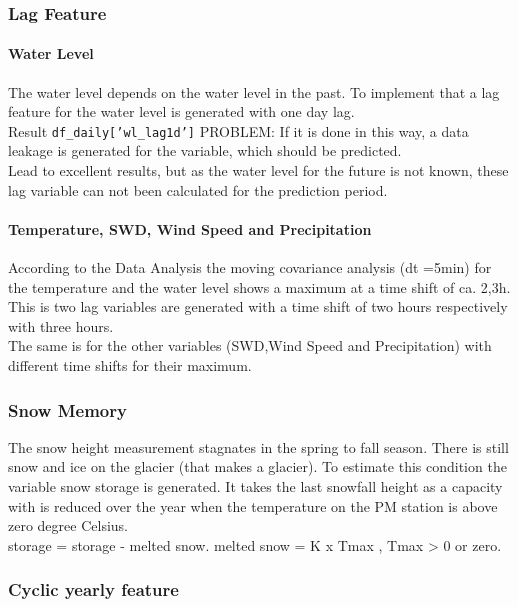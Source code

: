 \documentclass[a4paper,12pt]{article}
\begin{document}
\subsubsection{Lag Feature}

\paragraph{Water Level}
The water level depends on the water level in the past.
To implement that a lag feature for the water level is generated with one day lag. \\
Result \texttt{df\_daily['wl\_lag1d']}
PROBLEM: If it is done in this way, a data leakage is generated for the variable, which should be predicted.\\
Lead to excellent results, but as the water level for the future is not known, these lag variable can not been calculated for the prediction period.\\

\paragraph{Temperature, SWD, Wind Speed and Precipitation}
According to the Data Analysis the moving covariance analysis (dt =5min) for the temperature and the water level shows a maximum at a time shift of ca. 2,3h. \\
This is two lag variables are generated with a time shift of two hours respectively with three hours.\\
The same is for the other variables (SWD,Wind Speed and Precipitation) with different time shifts for their maximum.

\subsubsection{Snow Memory}
The snow height measurement stagnates in the spring to fall season.
There is still snow and ice on the glacier (that makes a glacier).
To estimate this condition the variable snow storage is generated.
It takes the last snowfall height as a capacity with is reduced over the year when the temperature on the PM station is above zero degree Celsius.\\
storage = storage - melted snow.
melted snow = K  x Tmax , Tmax > 0 or zero.

\subsubsection{Cyclic yearly feature}
\end{document}
